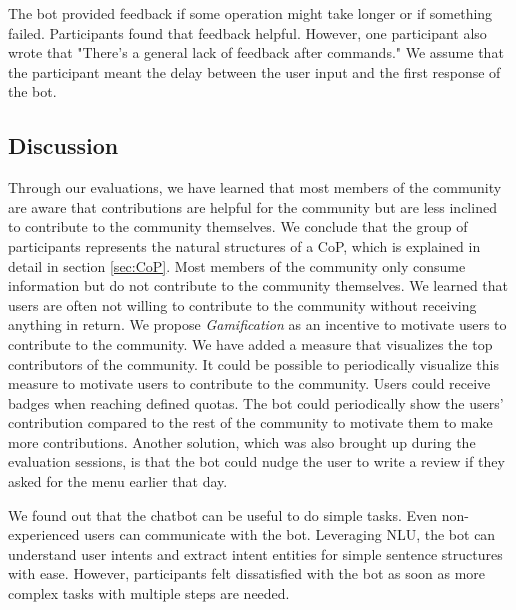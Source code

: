 The bot provided feedback if some operation might take longer or if something failed. Participants found that feedback helpful. However, one participant also wrote that "There's a general lack of feedback after commands." We assume that the participant meant the delay between the user input and the first response of the bot.  

\subsection{Discussion}
Through our evaluations, we have learned that most members of the community are aware that contributions are helpful for the community but are less inclined to contribute to the community themselves. 
We conclude that the group of participants represents the natural structures of a CoP, which is explained in detail in section \ref{sec:CoP}. Most members of the community only consume information but do not contribute to the community themselves. We learned that users are often not willing to contribute to the community without receiving anything in return. We propose \emph{Gamification} as an incentive to motivate users to contribute to the community.
We have added a measure that visualizes the top contributors of the community. It could be possible to periodically visualize this measure to motivate users to contribute to the community.
Users could receive badges when reaching defined quotas. The bot could periodically show the users' contribution compared to the rest of the community to motivate them to make more contributions.
Another solution, which was also brought up during the evaluation sessions, is that the bot could nudge the user to write a review if they asked for the menu earlier that day.

We found out that the chatbot can be useful to do simple tasks. Even non-experienced users can communicate with the bot. Leveraging NLU, the bot can understand user intents and extract intent entities for simple sentence structures with ease. However,  participants felt dissatisfied with the bot as soon as more complex tasks with multiple steps are needed. 
